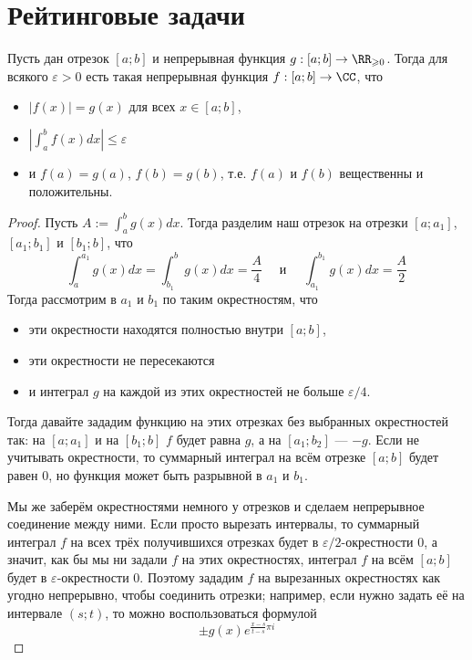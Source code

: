\documentclass[12pt,a4paper]{article}
\begin{document}
    \section*{Рейтинговые задачи}

    \begin{enumproblem}
        \begin{lemma}
            Пусть дан отрезок $[a; b]$ и непрерывная функция $g: [a; b] \to \RR_{\geqslant 0}$. Тогда для всякого $\varepsilon > 0$ есть такая непрерывная функция $f: [a; b] \to \CC$, что
            \begin{itemize}
                \item $|f(x)| = g(x)$ для всех $x \in [a; b]$,
                \item $|\int_a^b f(x) dx| \leqslant \varepsilon$
                \item и $f(a) = g(a)$, $f(b) = g(b)$, т.е. $f(a)$ и $f(b)$ вещественны и положительны.
            \end{itemize}
        \end{lemma}

        \begin{proof}
            Пусть $A := \int_a^b g(x) dx$. Тогда разделим наш отрезок на отрезки $[a; a_1]$, $[a_1; b_1]$ и $[b_1; b]$, что
            \[
                \int_a^{a_1} g(x) dx = \int_{b_1}^b g(x) dx = \frac{A}{4}
                \quad \text{ и } \quad
                \int_{a_1}^{b_1} g(x) dx = \frac{A}{2}
            \]
            Тогда рассмотрим в $a_1$ и $b_1$ по таким окрестностям, что
            \begin{itemize}
                \item эти окрестности находятся полностью внутри $[a; b]$,
                \item эти окрестности не пересекаются
                \item и интеграл $g$ на каждой из этих окрестностей не больше $\varepsilon/4$.
            \end{itemize}
            Тогда давайте зададим функцию на этих отрезках без выбранных окрестностей так: на $[a; a_1]$ и на $[b_1; b]$ $f$ будет равна $g$, а на $[a_1; b_2]$ --- $-g$. Если не учитывать окрестности, то суммарный интеграл на всём отрезке $[a; b]$ будет равен $0$, но функция может быть разрывной в $a_1$ и $b_1$.
            
            Мы же заберём окрестностями немного у отрезков и сделаем непрерывное соединение между ними. Если просто вырезать интервалы, то суммарный интеграл $f$ на всех трёх получившихся отрезках будет в $\varepsilon/2$-окрестности $0$, а значит, как бы мы ни задали $f$ на этих окрестностях, интеграл $f$ на всём $[a; b]$ будет в $\varepsilon$-окрестности $0$. Поэтому зададим $f$ на вырезанных окрестностях как угодно непрерывно, чтобы соединить отрезки; например, если нужно задать её на интервале $(s; t)$, то можно воспользоваться формулой
            \[\pm g(x) e^{\frac{x-s}{t-s}\pi i}\]


\end{proof}
\end{enumproblem}
\end{document}
